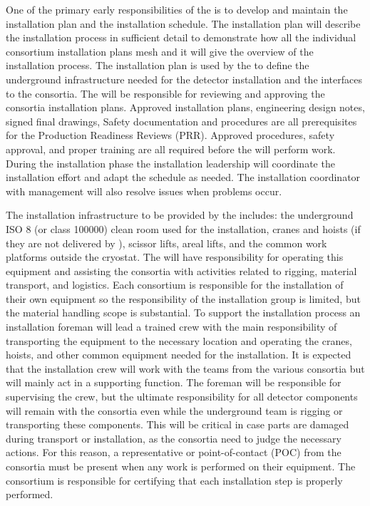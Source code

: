 One of the primary early responsibilities of the  is to
develop and maintain the  installation plan and the
installation schedule. The  installation plan will
describe the installation process in sufficient detail to demonstrate
how all the individual consortium installation plans mesh and it will
give the overview of the installation process. The installation plan
is used by the  to define the underground infrastructure
needed for the detector installation and the interfaces to the
consortia. The  will be responsible for reviewing and
approving the consortia installation plans. Approved installation
plans, engineering design notes, signed final drawings, Safety
documentation and procedures are all prerequisites for the Production
Readiness Reviews (PRR). Approved procedures, safety approval, and
proper training are all required before the  will perform
work. During the installation phase the installation leadership will
coordinate the  installation effort and adapt the schedule
as needed. The installation coordinator with management will also
resolve issues when problems occur.

The installation infrastructure to be provided by the  includes:
the underground ISO 8 (or class \num{100000}) clean room used for the
installation, cranes and hoists (if they are not delivered by
), scissor lifts, areal lifts, and the common work
platforms outside the cryostat. The  will have responsibility for
operating this equipment and assisting the consortia with activities
related to rigging, material transport, and logistics. Each consortium
is responsible for the installation of their own equipment so the
responsibility of the installation group is limited, but the material
handling scope is substantial. To support the installation process an
installation foreman will lead a trained crew with the main
responsibility of transporting the equipment to the necessary location
and operating the cranes, hoists, and other common equipment needed
for the installation. It is expected that the installation crew will
work with the teams from the various consortia but will mainly act in
a supporting function. The  foreman will be responsible for
supervising the  crew, but the ultimate responsibility for all
detector components will remain with the consortia even while the
underground team is rigging or transporting these components.  This
will be critical in case parts are damaged during transport or
installation, as the consortia need to judge the necessary
actions. For this reason, a representative or point-of-contact (POC)
from the consortia must be present when any work is performed on their
equipment. The consortium is responsible for certifying that each
installation step is properly performed.

